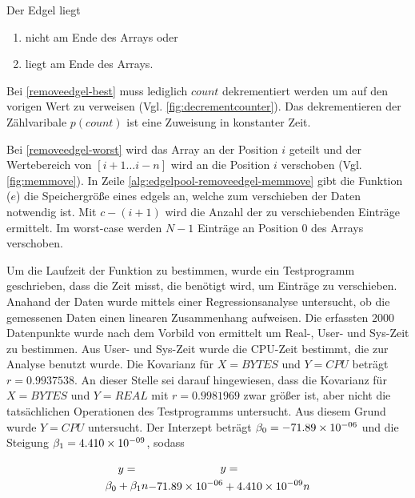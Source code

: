 Der Edgel liegt
\begin{enumerate}
	\item nicht am Ende des Arrays oder \label{removeedgel-worst}
	\item liegt am Ende des Arrays. \label{removeedgel-best}
\end{enumerate}

Bei \ref{removeedgel-best} muss lediglich $\mathit{count}$ dekrementiert werden um auf den vorigen Wert zu verweisen
 (Vgl. \autoref{fig:decrementcounter}). Das dekrementieren der Zählvaribale $p(\mathit{count})$ ist eine Zuweisung in
 konstanter Zeit. %

Bei \autoref{removeedgel-worst} wird das Array an der Position $i$ geteilt und der Wertebereich von $[i+1 \dotsc i-n]$
 wird an die Position $i$ verschoben (Vgl. \autoref{fig:memmove}). %
In Zeile \autoref{alg:edgelpool-removeedgel-memmove} gibt die Funktion ($e$) die Speichergröße eines
 \gls{edgels} an, welche zum verschieben der Daten notwendig ist. Mit $c - (i + 1)$ wird die Anzahl der zu
 verschiebenden Einträge ermittelt. Im worst-case werden $N-1$ Einträge an Position $0$ des Arrays verschoben.

Um die Laufzeit der Funktion  zu bestimmen, wurde ein Testprogramm geschrieben, dass die Zeit misst,
 die benötigt wird, um Einträge zu verschieben. Anahand der Daten wurde mittels einer Regressionsanalyse untersucht, ob
 die gemessenen Daten einen linearen Zusammenhang aufweisen. Die erfassten $2000$ Datenpunkte wurde nach dem Vorbild von
ermittelt um Real-, User- und Sys-Zeit zu bestimmen. Aus User- und Sys-Zeit wurde die CPU-Zeit bestimmt, die zur
 Analyse benutzt wurde. Die Kovarianz für $X = \mathit{BYTES}$ und $Y = \mathit{CPU}$ beträgt $r = 0.9937538$. An
 dieser Stelle sei darauf hingewiesen, dass die Kovarianz für $X = \mathit{BYTES}$ und
 $Y = \mathit{REAL}$ mit $r = 0.9981969$ zwar größer ist, aber nicht die tatsächlichen Operationen des Testprogramms
 untersucht. Aus diesem Grund wurde $Y = \mathit{CPU}$ untersucht. Der Interzept beträgt $\beta_0 = -71.89\times 10^{-06}$ und
 die Steigung $\beta_1 = 4.410\times 10^{-09}$, sodass

\begin{subequations}
\begin{multline}
	y =\\ \beta_0 + \beta_1n
\end{multline}
\begin{multline}
	y =\\ -71.89\e{-06} + 4.410\e{-09}n
\end{multline}
\end{subequations} %

